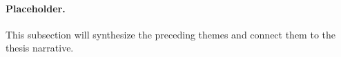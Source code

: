 \paragraph{Placeholder.}
This subsection will synthesize the preceding themes and connect them to the thesis narrative.
